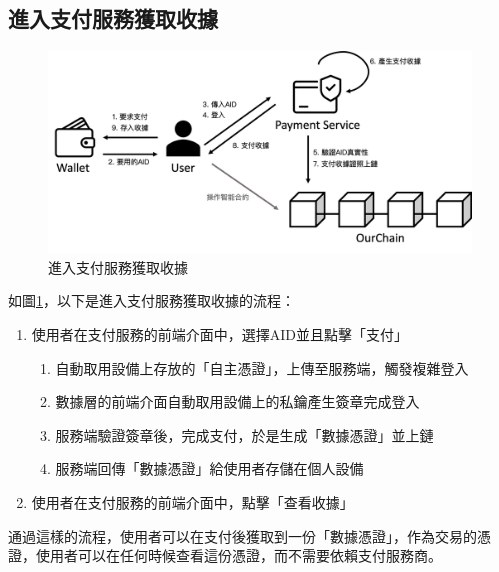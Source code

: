 \subsection{進入支付服務獲取收據}
\begin{figure}
  \centering
  \includegraphics[width=\linewidth, keepaspectratio]{figures/implement-2.png}
  \caption{進入支付服務獲取收據}
  \label{fig:implement-2}
\end{figure}
如圖\ref{fig:implement-2}，以下是進入支付服務獲取收據的流程：
\begin{enumerate}
  \item 使用者在支付服務的前端介面中，選擇AID並且點擊「支付」
        \begin{enumerate}
          \item 自動取用設備上存放的「自主憑證」，上傳至服務端，觸發複雜登入
          \item 數據層的前端介面自動取用設備上的私鑰產生簽章完成登入
          \item 服務端驗證簽章後，完成支付，於是生成「數據憑證」並上鏈
          \item 服務端回傳「數據憑證」給使用者存儲在個人設備
        \end{enumerate}
  \item 使用者在支付服務的前端介面中，點擊「查看收據」
\end{enumerate}
通過這樣的流程，使用者可以在支付後獲取到一份「數據憑證」，作為交易的憑證，使用者可以在任何時候查看這份憑證，而不需要依賴支付服務商。
